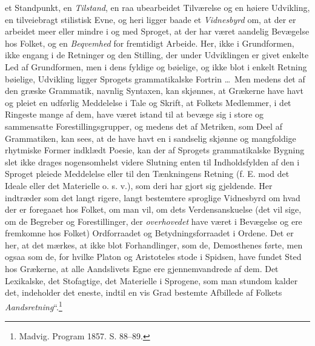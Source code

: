 \documentclass[12pt]{book}
\newcommand{\opage}[1]{\marginnote{\footnotesize\textit{[#1]}}}
\begin{document}
et Standpunkt, en \emph{Tilstand}, en raa ubearbeidet Tilværelse
og en høiere Udvikling, en tilveiebragt stilistisk Evne, og heri
ligger baade et \emph{Vidnesbyrd} om, at der er arbeidet meer
\opage{45}eller mindre i og med Sproget, at der har været aandelig
Bevægelse hos Folket, og en \emph{Beqvemhed} for fremtidigt
Arbeide. Her, ikke i Grundformen, ikke engang i de
Retninger og den Stilling, der under Udviklingen er givet enkelte
Led af Grundformen, men i dens fyldige og bøielige, og ikke
blot i enkelt Retning bøielige, Udvikling ligger Sprogets
grammatikalske Fortrin \ldots\ Men medens det af den græske
Grammatik, navnlig Syntaxen, kan skjønnes, at Grækerne
have havt og pleiet en udførlig Meddelelse i Tale og Skrift,
at Folkets Medlemmer, i det Ringeste mange af dem, have
været istand til at bevæge sig i store og sammensatte
Forestillingsgrupper, og medens det af Metriken, som Deel af
Grammatiken, kan sees, at de have havt en i sandselig skjønne
og mangfoldige rhytmiske Former indklædt Poesie, kan der
af Sprogets grammatikalske Bygning slet ikke drages
nogensomhelst videre Slutning enten til Indholdsfylden af den i
Sproget pleiede Meddelelse eller til den Tænkningens Retning
(f. E. mod det Ideale eller det Materielle o. s. v.), som deri
har gjort sig gjeldende. Her indtræder som det langt rigere,
langt bestemtere sproglige Vidnesbyrd om hvad der er
foregaaet hos Folket, om man vil, om dets Verdensanskuelse (det
vil sige, om de Begreber og Forestillinger, der \emph{overhovedet}
have været i Bevægelse og ere fremkomne hos Folket)
Ordforraadet og Betydningsforraadet i Ordene. Det er her, at
det mærkes, at ikke blot Forhandlinger, som de, Demosthenes
førte, men ogsaa som de, for hvilke Platon og Aristoteles stode
i Spidsen, have fundet Sted hos Grækerne, at alle
Aandslivets Egne ere gjennemvandrede af dem. Det Lexikalske, det
Stofagtige, det Materielle i Sprogene, som man stundom
kalder det, indeholder det eneste, indtil en vis Grad bestemte
Afbillede af Folkets \emph{Aandsretning}“.\footnote{%
Madvig. Program 1857. S. 88--89.}
\end{document}
